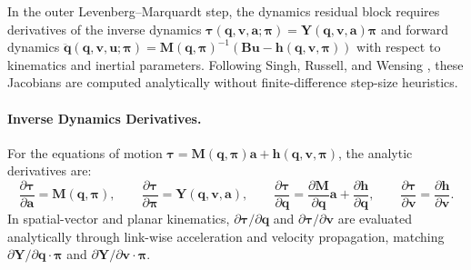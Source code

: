 \documentclass[11pt,a4paper]{article}
\newcommand{\bq}{\mathbf{q}}
\newcommand{\bv}{\mathbf{v}}
\newcommand{\ba}{\mathbf{a}}
\newcommand{\bu}{\mathbf{u}}
\newcommand{\bh}{\mathbf{h}}
\newcommand{\bM}{\mathbf{M}}
\newcommand{\bY}{\mathbf{Y}}
\newcommand{\bB}{\mathbf{B}}
\newcommand{\bpi}{\boldsymbol{\pi}}
\begin{document}
In the outer Levenberg--Marquardt step, the dynamics residual block requires derivatives
of the inverse dynamics $\boldsymbol{\tau}(\bq, \bv, \ba; \bpi) = \bY(\bq, \bv, \ba)\bpi$
and forward dynamics $\ddot{\bq}(\bq, \bv, \bu; \bpi) = \bM(\bq, \bpi)^{-1}(\bB\bu - \bh(\bq, \bv, \bpi))$
with respect to kinematics and inertial parameters. Following Singh, Russell, and Wensing \cite{Singh2022},
these Jacobians are computed analytically without finite-difference step-size heuristics.

\paragraph{Inverse Dynamics Derivatives.}
For the equations of motion $\boldsymbol{\tau} = \bM(\bq, \bpi)\ba + \bh(\bq, \bv, \bpi)$, the analytic derivatives are:
\begin{equation}
  \frac{\partial \boldsymbol{\tau}}{\partial \ba} = \bM(\bq, \bpi), \qquad
  \frac{\partial \boldsymbol{\tau}}{\partial \bpi} = \bY(\bq, \bv, \ba), \qquad
  \frac{\partial \boldsymbol{\tau}}{\partial \bq} = \frac{\partial \bM}{\partial \bq}\ba + \frac{\partial \bh}{\partial \bq}, \qquad
  \frac{\partial \boldsymbol{\tau}}{\partial \bv} = \frac{\partial \bh}{\partial \bv} .
\end{equation}
In spatial-vector and planar kinematics, $\partial \boldsymbol{\tau}/\partial \bq$ and
$\partial \boldsymbol{\tau}/\partial \bv$ are evaluated analytically through link-wise
acceleration and velocity propagation, matching $\partial\bY/\partial\bq\cdot\bpi$ and $\partial\bY/\partial\bv\cdot\bpi$.
\end{document}
